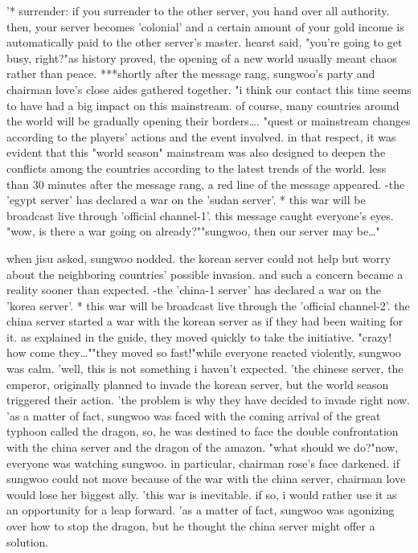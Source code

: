 '* surrender: if you surrender to the other server, you hand over all authority.
 then, your server becomes 'colonial' and a certain amount of your gold income is automatically paid to the other server's master.
hearst said, "you're going to get busy, right?"as history proved, the opening of a new world usually meant chaos rather than peace.
***shortly after the message rang, sungwoo's party and chairman love's close aides gathered together.
"i think our contact this time seems to have had a big impact on this mainstream.
 of course, many countries around the world will be gradually opening their borders….
"quest or mainstream changes according to the players' actions and the event involved.
 in that respect, it was evident that this "world season" mainstream was also designed to deepen the conflicts among the countries according to the latest trends of the world.
less than 30 minutes after the message rang, a red line of the message appeared.
 -the 'egypt server' has declared a war on the 'sudan server'.
* this war will be broadcast live through 'official channel-1'.
this message caught everyone's eyes.
"wow, is there a war going on already?""sungwoo, then our server may be…"

when jisu asked, sungwoo nodded.
 the korean server could not help but worry about the neighboring countries' possible invasion.
 and such a concern became a reality sooner than expected.
-the 'china-1 server' has declared a war on the 'korea server'.
* this war will be broadcast live through the 'official channel-2'.
the china server started a war with the korean server as if they had been waiting for it.
as explained in the guide, they moved quickly to take the initiative.
 "crazy! how come they…""they moved so fast!"while everyone reacted violently, sungwoo was calm.
'well, this is not something i haven't expected.
'the chinese server, the emperor, originally planned to invade the korean server, but the world season triggered their action.
'the problem is why they have decided to invade right now.
'as a matter of fact, sungwoo was faced with the coming arrival of the great typhoon called the dragon, so, he was destined to face the double confrontation with the china server and the dragon of the amazon.
 "what should we do?"now, everyone was watching sungwoo.
 in particular, chairman rose's face darkened.
if sungwoo could not move because of the war with the china server, chairman love would lose her biggest ally.
'this war is inevitable.
 if so, i would rather use it as an opportunity for a leap forward.
'as a matter of fact, sungwoo was agonizing over how to stop the dragon, but he thought the china server might offer a solution.


 